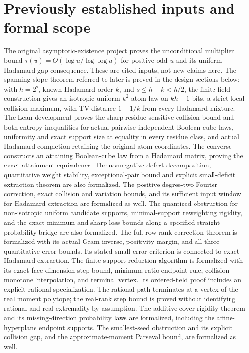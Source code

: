 \documentclass[11pt]{article}
\begin{document}
\section*{Previously established inputs and formal scope}
The original asymptotic-existence project proves the unconditional multiplier
bound $\tau(u)=O(\log u/\log\log u)$ for positive odd $u$ and its uniform
Hadamard-gap consequence. These are cited inputs, not new claims here.
The spanning-slope theorem referred to later is proved in the design sections
below: with $h=2^s$, known Hadamard order $k$, and $s\le h-k<h/2$, the
finite-field construction gives an isotropic uniform $h^2$-atom law on $kh-1$
bits, a strict local collision maximum, with TV distance $1-1/k$ from every
Hadamard mixture.
The Lean development proves the sharp residue-sensitive collision bound
and both entropy inequalities for actual pairwise-independent Boolean-cube
laws, uniformity and exact support size at equality in every residue class,
and actual Hadamard completion retaining the original atom coordinates.
The converse constructs an attaining Boolean-cube law from a Hadamard
matrix, proving the exact attainment equivalence. The nonnegative defect
decomposition, quantitative weight stability, exceptional-pair bound and
explicit small-deficit extraction theorem are also formalized. The positive
degree-two Fourier correction, exact collision and variation bounds, and
its sufficient input window for Hadamard extraction are formalized as well.
The quantized obstruction for non-isotropic uniform candidate supports,
minimal-support reweighting rigidity, and the exact minimum and sharp loss
bounds along a specified straight probability bridge are also formalized.
The full-row-rank correction theorem is formalized with its actual Gram
inverse, positivity margin, and all three quantitative error bounds.
Its stated small-error criterion is connected to exact Hadamard extraction.
The finite support-reduction algorithm is formalized with its exact
face-dimension step bound, minimum-ratio endpoint rule, collision-monotone
interpolation, and terminal vertex. Its ordered-field proof includes an
explicit rational specialization.
The rational path terminates at a vertex of the real moment polytope;
the real-rank step bound is proved without identifying rational and real
extremality by assumption.
The additive-cover rigidity theorem and its missing-direction probability
laws are formalized, including the affine-hyperplane endpoint supports.
The smallest-seed obstruction and its explicit collision gap, and the
approximate-moment Parseval bound, are formalized as well.
\end{document}
